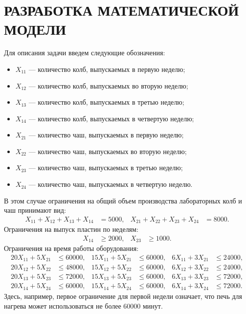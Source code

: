 \section{РАЗРАБОТКА МАТЕМАТИЧЕСКОЙ МОДЕЛИ}

Для описания задачи введем следующие обозначения:

\begin{itemize}
  \item \( X_{11} \) --- количество колб, выпускаемых в первую неделю;
  \item \( X_{12} \) --- количество колб, выпускаемых во вторую неделю;
  \item \( X_{13} \) --- количество колб, выпускаемых в третью неделю;
  \item \( X_{14} \) --- количество колб, выпускаемых в четвертую неделю;

  \item \( X_{21} \) --- количество чаш,  выпускаемых в первую неделю;
  \item \( X_{22} \) --- количество чаш,  выпускаемых во вторую неделю;
  \item \( X_{23} \) --- количество чаш,  выпускаемых в третью неделю;
  \item \( X_{24} \) --- количество чаш,  выпускаемых в четвертую неделю.
\end{itemize}

В этом случае ограничения на общий объем производства лабораторных колб и чаш принимают вид:
\begin{align*}
  X_{11} + X_{12} + X_{13} + X_{14} &= 5000, 
  & X_{21} + X_{22} + X_{23} + X_{24} &= 8000.
\end{align*}
Ограничения на выпуск пластин по неделям:
\begin{align*}
  X_{14} &\ge 2000, & X_{23} &\ge 1000.
\end{align*}
Ограничения на время работы оборудования:
\begin{align*}
    20X_{11} + 5X_{21}  &\le 60000,
  & 15X_{11} + 5X_{21}  &\le 60000, 
  & 6X_{11}  + 3X_{21}  &\le 24000, \\  
    20X_{12} + 5X_{22}    &\le 48000,
  & 15X_{12} + 5X_{22}    &\le 60000, 
  & 6X_{12}  + 3X_{22}    &\le 24000, \\
    20X_{13} + 5X_{23}  &\le 72000,
  & 15X_{13} + 5X_{23}  &\le 60000, 
  & 6X_{13}  + 3X_{23}  &\le 72000, \\
    20X_{14} + 5X_{24}    &\le 60000,
  & 15X_{14} + 5X_{24}    &\le 60000, 
  & 6X_{14}  + 3X_{24}    &\le 72000. 
\end{align*}
Здесь, например, первое ограничение для первой недели означает, что 
печь для нагрева может использоваться не более
60000 минут.

